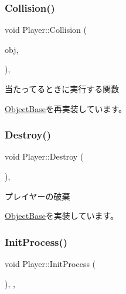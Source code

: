 \subsubsection{\texorpdfstring{Collision()}{Collision()}}
{\footnotesize\ttfamily void Player\+::\+Collision (\begin{DoxyParamCaption}\item[{\mbox{\hyperlink{class_object_base}{Object\+Base}} $\ast$}]{obj,  }\item[{\mbox{\hyperlink{transform_8h_afb0c5e21d4133ff4f200992c0b534e1b}{V\+E\+C2}}}]{ }\end{DoxyParamCaption})\hspace{0.3cm}{\ttfamily [final]}, {\ttfamily [virtual]}}



当たってるときに実行する関数 



\mbox{\hyperlink{class_object_base_ad772d7a42f5e46c39481f5db22ee8193}{Object\+Base}}を再実装しています。

\mbox{\label{class_player_af2cf4936165ef12cce96f7994e0879df}} 
\subsubsection{\texorpdfstring{Destroy()}{Destroy()}}
{\footnotesize\ttfamily void Player\+::\+Destroy (\begin{DoxyParamCaption}{ }\end{DoxyParamCaption})\hspace{0.3cm}{\ttfamily [final]}, {\ttfamily [virtual]}}



プレイヤーの破棄 



\mbox{\hyperlink{class_object_base_a7fa4c548153c3af20f89673ffea809af}{Object\+Base}}を実装しています。

\mbox{\label{class_player_a1051f85c8bf18a256d275d1a1dee5da6}} 
\subsubsection{\texorpdfstring{Init\+Process()}{InitProcess()}}
{\footnotesize\ttfamily void Player\+::\+Init\+Process (\begin{DoxyParamCaption}{ }\end{DoxyParamCaption})\hspace{0.3cm}{\ttfamily [final]}, {\ttfamily [protected]}, {\ttfamily [virtual]}}



